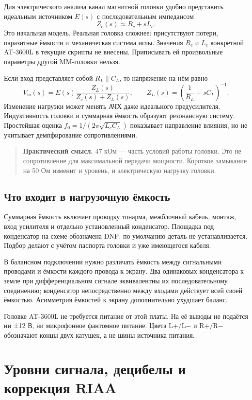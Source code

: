 \documentclass[a4paper,11pt]{article}
\newcommand{\practicalnote}[1]{\begin{quote}\small\textbf{Практический смысл. }#1\end{quote}}
\begin{document}
Для электрического анализа канал магнитной головки удобно представить
идеальным источником $E(s)$ с последовательным импедансом
\[
 Z_c(s)\approx R_c+sL_c.
\]
Это начальная модель. Реальная головка сложнее: присутствуют потери,
паразитные ёмкости и механическая система иглы. Значения $R_c$ и $L_c$ конкретной
AT-3600L в текущие скрипты не внесены. Приписывать ей произвольные параметры другой
MM-головки нельзя.

Если вход представляет собой $R_L\parallel C_L$, то напряжение на нём равно
\[
 V_{\mathrm{in}}(s)=E(s)\frac{Z_L(s)}{Z_c(s)+Z_L(s)},\qquad
 Z_L(s)=\left(\frac1{R_L}+sC_L\right)^{-1}.
\]
Изменение нагрузки может менять АЧХ даже идеального предусилителя. Индуктивность
головки и суммарная ёмкость образуют резонансную систему. Простейшая оценка
$f_0=1/(2\pi\sqrt{L_cC_L})$ показывает направление влияния, но не учитывает
демпфирование сопротивлениями.

\practicalnote{47 кОм — часть условий работы головки. Это не сопротивление для
максимальной передачи мощности. Короткое замыкание на 50 Ом изменит и уровень,
и электрическую нагрузку головки.}

\subsection{Что входит в нагрузочную ёмкость}

Суммарная ёмкость включает проводку тонарма, межблочный кабель, монтаж,
вход усилителя и отдельно установленный конденсатор. Площадка под конденсатор
на схеме обозначена DNP: по умолчанию деталь не устанавливается.
Подбор делают с учётом паспорта головки и уже имеющегося кабеля.

В балансном подключении нужно различать ёмкость между сигнальными проводами и
ёмкости каждого провода к экрану. Два одинаковых конденсатора к земле при
дифференциальном сигнале эквивалентны их последовательному соединению;
конденсатор непосредственно между входами действует всей своей ёмкостью.
Асимметрия ёмкостей к экрану дополнительно ухудшает баланс.

Головке AT-3600L не требуется питание от этой платы. На её выводы не подаётся
ни ±12 В, ни микрофонное фантомное питание. Цвета L+/L− и R+/R− обозначают
концы двух катушек, а не шины источника питания.

\section{Уровни сигнала, децибелы и коррекция RIAA}
\end{document}

